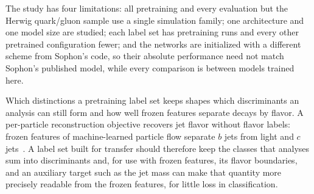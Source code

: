 The study has four limitations: all pretraining and every evaluation but the Herwig quark/gluon sample use a
single simulation family; one architecture and one model size are studied; each label set
has \MlstNRunsWord{} pretraining runs and every other pretrained configuration fewer; and the networks are initialized %
with a different scheme from Sophon's code, so their absolute performance need not match Sophon's published
model, while every comparison is between models trained here.

Which distinctions a pretraining label set keeps shapes which discriminants an analysis can still form and how
well frozen features separate decays by flavor. %
A per-particle reconstruction objective recovers jet flavor without flavor labels: frozen features of
machine-learned particle flow separate $b$ jets from light and $c$ jets~\cite{mlpf_fm}. A
label set built for transfer should therefore keep the classes that analyses sum into discriminants
and, for use with frozen features, its flavor boundaries, and an auxiliary target such as the jet mass can
make that quantity more precisely readable from the frozen features, for little loss in classification.
